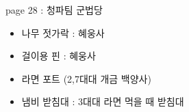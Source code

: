 \documentclass[aspectratio=1610,17pt,xcolor=pdftex,dvipsnames,table,handout]{beamer}
\begin{document}
		\begin{frame} [t,plain]

			\begin{block} { page 28 : 청파팀 군법당 }

			\begin{itemize}
			\item 	나무 젓가락 : 혜웅사
			\item 	걸이용 핀 : 혜웅사
			\item 	라면 포트 (2,7대대 개금 백양사)
			\item 	냄비 받침대 : 3대대 라면 먹을 때 받침대
			\end{itemize}



			\end{block}			
								
		\end{frame}	 %


%
%

%
%
%								
\end{document}

